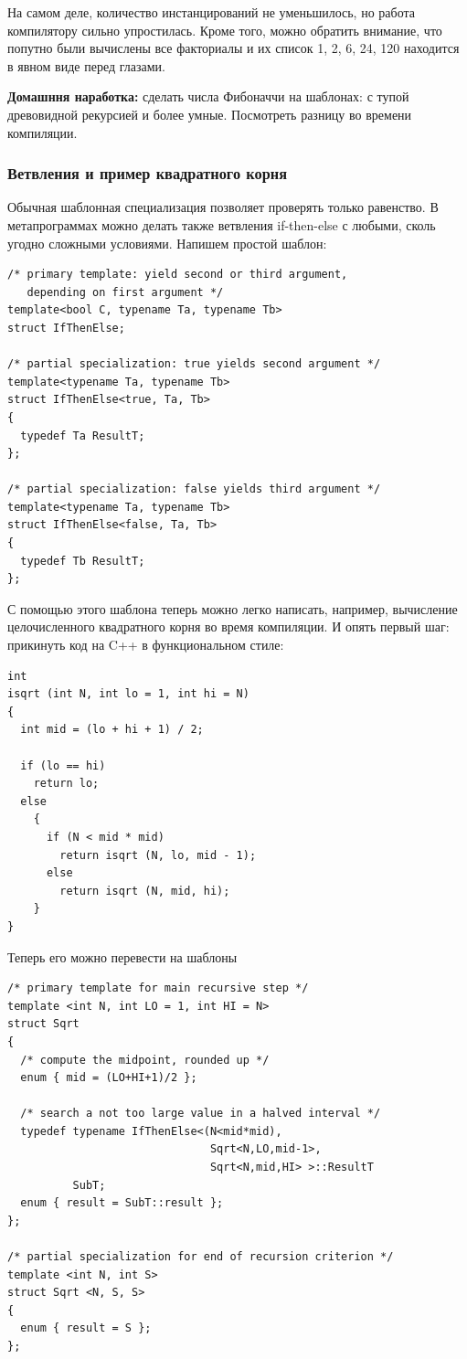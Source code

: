 \documentclass[a4paper,12pt,oneside]{article}
\begin{document}
На самом деле, количество инстанцирований не уменьшилось, но работа компилятору сильно упростилась. Кроме того, можно обратить внимание, что попутно были вычислены все факториалы и их список 1, 2, 6, 24, 120 находится в явном виде перед глазами.

\textbf{Домашння наработка:} сделать числа Фибоначчи на шаблонах: с тупой древовидной рекурсией и более умные. Посмотреть разницу во времени компиляции.

\subsubsection{Ветвления и пример квадратного корня}\label{TemplateIfElse}

Обычная шаблонная специализация позволяет проверять только равенство. В метапрограммах можно делать также ветвления if-then-else с любыми, сколь угодно сложными условиями. Напишем простой шаблон:

\begin{lstlisting}
/* primary template: yield second or third argument, 
   depending on first argument */
template<bool C, typename Ta, typename Tb> 
struct IfThenElse; 

/* partial specialization: true yields second argument */
template<typename Ta, typename Tb> 
struct IfThenElse<true, Ta, Tb> 
{ 
  typedef Ta ResultT; 
}; 

/* partial specialization: false yields third argument */
template<typename Ta, typename Tb> 
struct IfThenElse<false, Ta, Tb> 
{ 
  typedef Tb ResultT; 
}; 
\end{lstlisting}

С помощью этого шаблона теперь можно легко написать, например, вычисление целочисленного квадратного корня во время компиляции.
И опять первый шаг: прикинуть код на C++ в функциональном стиле:

\begin{lstlisting}
int
isqrt (int N, int lo = 1, int hi = N)
{
  int mid = (lo + hi + 1) / 2;

  if (lo == hi)
    return lo;
  else
    {
      if (N < mid * mid)
        return isqrt (N, lo, mid - 1);
      else
        return isqrt (N, mid, hi);
    }
}
\end{lstlisting}

Теперь его можно перевести на шаблоны

\begin{lstlisting}
/* primary template for main recursive step */
template <int N, int LO = 1, int HI = N> 
struct Sqrt 
{ 
  /* compute the midpoint, rounded up */
  enum { mid = (LO+HI+1)/2 }; 

  /* search a not too large value in a halved interval */
  typedef typename IfThenElse<(N<mid*mid), 
                               Sqrt<N,LO,mid-1>, 
                               Sqrt<N,mid,HI> >::ResultT 
          SubT; 
  enum { result = SubT::result }; 
}; 

/* partial specialization for end of recursion criterion */
template <int N, int S> 
struct Sqrt <N, S, S> 
{ 
  enum { result = S }; 
}; 
\end{lstlisting}
\end{document}
